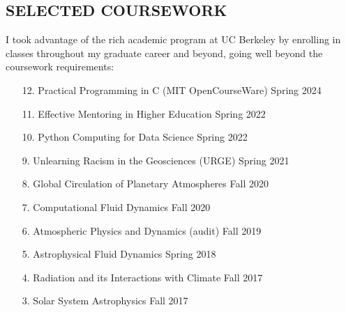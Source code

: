 \documentclass[margin, 10pt]{res} %
\begin{document}
\begin{resume}



\section{SELECTED COURSEWORK}

I took advantage of the rich academic program at UC Berkeley by enrolling in classes throughout my graduate career and beyond, going well beyond the coursework requirements:

\begin{enumerate}
	
	\item[12.] Practical Programming in C (MIT OpenCourseWare) \hfill Spring 2024
	
	\item[11.] Effective Mentoring in Higher Education \hfill Spring 2022
	
	\item[10.] Python Computing for Data Science \hfill Spring 2022
	
	\item[9.] Unlearning Racism in the Geosciences (URGE) \hfill Spring 2021
	
	\item[8.] Global Circulation of Planetary Atmospheres \hfill Fall 2020
	
	\item[7.] Computational Fluid Dynamics \hfill Fall 2020
	
	\item[6.] Atmospheric Physics and Dynamics (audit) \hfill Fall 2019
	
	\item[5.] Astrophysical Fluid Dynamics \hfill Spring 2018
	
	\item[4.] Radiation and its Interactions with Climate \hfill Fall 2017
	
	\item[3.] Solar System Astrophysics \hfill Fall 2017
	

\end{enumerate}
\end{resume}
\end{document}
